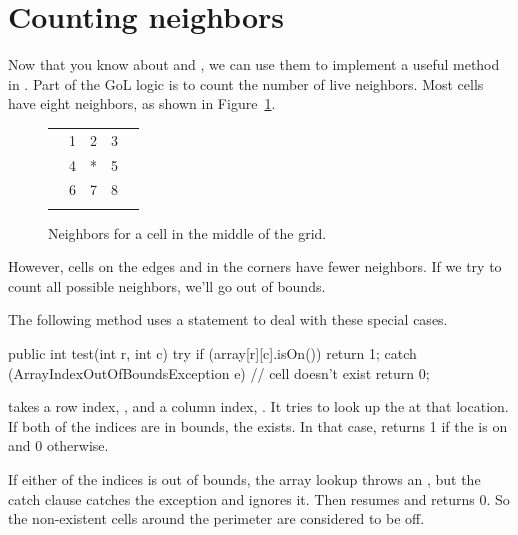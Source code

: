 \section{Counting neighbors}


Now that you know about  and , we can use them to implement a useful method in .
Part of the GoL logic is to count the number of live neighbors.
Most cells have eight neighbors, as shown in Figure~\ref{fig:neighbors}.

\begin{figure}[!ht]
\begin{center}
\begin{tabular}{|p{1em}|p{1em}|p{1em}|p{1em}|p{1em}|}
\hline
  &   &   &   &   \\
\hline
  & 1 & 2 & 3 &   \\
\hline
  & 4 & * & 5 &   \\
\hline
  & 6 & 7 & 8 &   \\
\hline
  &   &   &   &   \\
\hline
\end{tabular}
\caption{Neighbors for a cell in the middle of the grid.}
\label{fig:neighbors}
\end{center}
\end{figure}

However, cells on the edges and in the corners have fewer neighbors.
If we try to count all possible neighbors, we'll go out of bounds.

The following method uses a  statement to deal with these special cases.

\begin{code}
    public int test(int r, int c) {
        try {
            if (array[r][c].isOn()) {
                return 1;
            }
        } catch (ArrayIndexOutOfBoundsException e) {
            // cell doesn't exist
        }
        return 0;
    }
\end{code}

 takes a row index, , and a column index, .
It tries to look up the  at that location.
If both of the indices are in bounds, the  exists.  In that case,  returns 1 if the  is on and 0 otherwise.

If either of the indices is out of bounds, the array lookup throws an , but the catch clause catches the exception and ignores it.
Then  resumes and returns 0.
So the non-existent cells around the perimeter are considered to be off.

